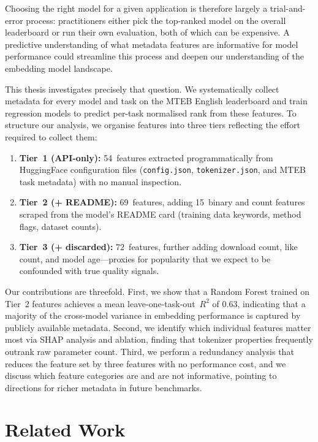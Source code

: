 \documentclass[11pt,a4paper,twocolumn]{article}
\begin{document}
Choosing the right model for a given application is therefore largely a trial-and-error process: practitioners either pick the top-ranked model on the overall leaderboard or run their own evaluation, both of which can be expensive.
A predictive understanding of what metadata features are informative for model performance could streamline this process and deepen our understanding of the embedding model landscape.

This thesis investigates precisely that question.
We systematically collect metadata for every model and task on the MTEB English leaderboard and train regression models to predict per-task normalised rank from these features.
To structure our analysis, we organise features into three tiers reflecting the effort required to collect them:

\begin{enumerate}
    \item \textbf{Tier~1 (API-only):} 54~features extracted programmatically from HuggingFace configuration files (\texttt{config.json}, \texttt{tokenizer.json}, and MTEB task metadata) with no manual inspection.
    \item \textbf{Tier~2 (+ README):} 69~features, adding 15~binary and count features scraped from the model's README card (training data keywords, method flags, dataset counts).
    \item \textbf{Tier~3 (+ discarded):} 72~features, further adding download count, like count, and model age---proxies for popularity that we expect to be confounded with true quality signals.
\end{enumerate}

Our contributions are threefold.
First, we show that a Random Forest trained on Tier~2 features achieves a mean leave-one-task-out~$R^2$ of 0.63, indicating that a majority of the cross-model variance in embedding performance is captured by publicly available metadata.
Second, we identify which individual features matter most via SHAP analysis and ablation, finding that tokenizer properties frequently outrank raw parameter count.
Third, we perform a redundancy analysis that reduces the feature set by three features with no performance cost, and we discuss which feature categories are and are not informative, pointing to directions for richer metadata in future benchmarks.


\section{Related Work}
\label{sec:related}
\end{document}
